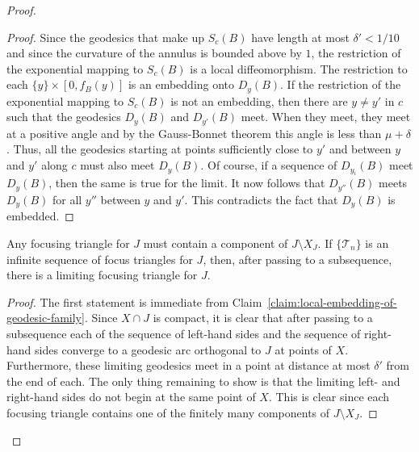 \begin{proof}
\begin{proof}
Since the geodesics that make up $S_c(B)$ have length at most
$\delta'<1/10$ and since the curvature of the annulus is bounded
above by $1$, the restriction of the exponential mapping to $S_c(B)$
is a local diffeomorphism. The restriction  to each $\{y\}\times
[0,f_B(y)]$ is an embedding onto $D_y(B)$. If the restriction of the
exponential mapping to $S_c(B)$ is not an embedding, then there are
$y\not= y'$ in $c$ such that the geodesics $D_y(B)$ and $D_{y'}(B)$
meet. When they meet, they meet at a positive angle and by the
Gauss-Bonnet theorem this angle is less than $\mu+\delta$.  Thus,
all the geodesics starting at points sufficiently close to $y'$ and
between $y$ and $y'$ along $c$ must also meet $D_y(B)$. Of course,
if a sequence of $D_{y_i}(B)$ meet $D_y(B)$, then the same is true
for the limit. It now follows that $D_{y''}(B)$ meets $D_y(B)$ for
all $y''$ between $y$ and $y'$. This contradicts the fact that
$D_y(B)$ is embedded.
\end{proof}




\begin{claim}
\label{claim:focusing-triangle-limit-existence}
\label{limittri}
Any focusing triangle for $J$ must contain a component of $J\setminus X_J $. If
$\{{\mathcal T}_n\}$ is an infinite sequence of focus triangles for $J$, then,
after passing to a subsequence, there is a limiting focusing triangle for $J$.
\end{claim}

\begin{proof}
The first statement is immediate from Claim~\ref{claim:local-embedding-of-geodesic-family}.
 Since $X\cap J$ is compact, it is clear that after passing to a
 subsequence each of the sequence of left-hand sides and the
 sequence of right-hand sides  converge to a geodesic arc orthogonal to
 $J$ at points of $X$. Furthermore, these limiting geodesics meet in
 a point at distance at most $\delta'$ from the end of each. The only
 thing remaining to show is that the limiting left- and right-hand
 sides do not begin at the same point of $X$.
This is clear since each focusing triangle contains one of the finitely many
components of $J\setminus X_J$.
\end{proof}


\end{proof}

